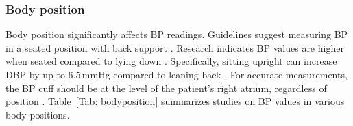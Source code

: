 \documentclass[journal,article,moreauthors]{Definitions/mdpi}
\begin{document}
\subsubsection{Body position} 

Body position significantly affects BP readings. Guidelines suggest measuring BP in a seated position with back support \citep{mancia20132013}. Research indicates BP values are higher when seated compared to lying down \citep{krzesinski2016diagnostic, privvsek2018epidemiological, Netea2003}. Specifically, sitting upright can increase DBP by up to 6.5\,mmHg compared to leaning back \citep{ogedegbe2010principles}. For accurate measurements, the BP cuff should be at the level of the patient's right atrium, regardless of position \citep{muntner2019measurement}. Table~\ref{Tab: bodyposition} summarizes studies on BP values in various body positions.
\end{document}
